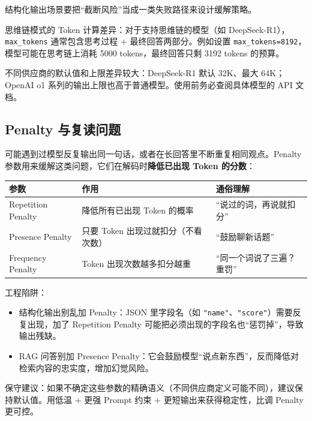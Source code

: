 \documentclass[9pt,a4paper,twocolumn]{ctexart}
\begin{document}
结构化输出场景要把“截断风险”当成一类失败路径来设计缓解策略。



思维链模式的 Token 计算差异：对于支持思维链的模型（如 DeepSeek-R1），\texttt{max\_tokens} 通常包含思考过程 + 最终回答两部分。例如设置 \texttt{max\_tokens=8192}，模型可能在思考链上消耗 5000 tokens，最终回答只剩 3192 tokens 的预算。



不同供应商的默认值和上限差异较大：DeepSeek-R1 默认 32K、最大 64K；OpenAI o1 系列的输出上限也高于普通模型。使用前务必查阅具体模型的 API 文档。



\subsection*{Penalty 与复读问题}


可能遇到过模型反复输出同一句话，或者在长回答里不断重复相同观点。Penalty 参数用来缓解这类问题，它们在解码时\textbf{降低已出现 Token 的分数}：


{\footnotesize
\begin{tabular}{|p{}|p{}|p{}|}
\hline
\textbf{参数} & \textbf{作用} & \textbf{通俗理解} \\
\hline
Repetition Penalty & 降低所有已出现 Token 的概率 & “说过的词，再说就扣分” \\
\hline
Presence Penalty & 只要 Token 出现过就扣分（不看次数） & “鼓励聊新话题” \\
\hline
Frequency Penalty & Token 出现次数越多扣分越重 & “同一个词说了三遍？重罚” \\
\hline
\end{tabular}
}



工程陷阱：


\begin{itemize}[itemsep=1pt, topsep=2pt]
  \item 结构化输出别乱加 Penalty：JSON 里字段名（如 \texttt{"name"}、\texttt{"score"}）需要反复出现，加了 Repetition Penalty 可能把必须出现的字段名也“惩罚掉”，导致输出残缺。
  \item RAG 问答别加 Presence Penalty：它会鼓励模型“说点新东西”，反而降低对检索内容的忠实度，增加幻觉风险。
\end{itemize}


保守建议：如果不确定这些参数的精确语义（不同供应商定义可能不同），建议保持默认值。用低温 + 更强 Prompt 约束 + 更短输出来获得稳定性，比调 Penalty 更可控。
\end{document}
